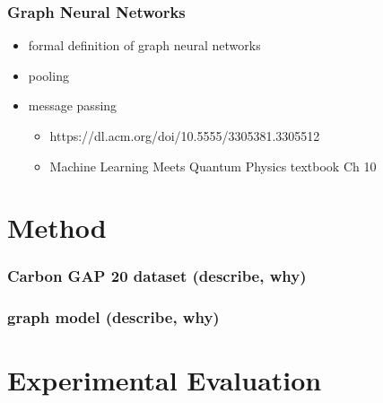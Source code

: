 \documentclass[12pt]{scrartcl}
\begin{document}
\subsubsection{Graph Neural Networks}    
\begin{itemize}
    \item formal definition of graph neural networks
    \item pooling
    \item message passing
    \begin{itemize}
        \item https://dl.acm.org/doi/10.5555/3305381.3305512
        \item Machine Learning Meets Quantum Physics textbook Ch 10
    \end{itemize}
\end{itemize}

  




\newpage 

\section{Method}
\subsubsection{Carbon GAP 20 dataset (describe, why)}  
\subsubsection{graph model (describe, why)}  

\newpage

\section{Experimental Evaluation}
\end{document}
